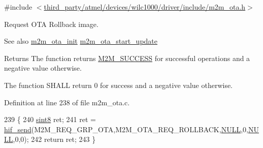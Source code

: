 {\ttfamily \#include $<$\hyperlink{m2m__ota_8h}{third\+\_\+party/atmel/devices/wilc1000/driver/include/m2m\+\_\+ota.\+h}$>$}



Request O\+TA Rollback image. 

\begin{DoxySeeAlso}{See also}
\hyperlink{group__OtaInitFn_gacd2a1a8ffaccc3deb1970cf1ad41ceec}{m2m\+\_\+ota\+\_\+init} \hyperlink{group__OtaStartUpdatefn_gac50387eab16b3257f1c037942f2682fd}{m2m\+\_\+ota\+\_\+start\+\_\+update}
\end{DoxySeeAlso}
\begin{DoxyReturn}{Returns}
The function returns \hyperlink{nm__common_8h_a9ef27ba27aafdd1aa3a79d3ba2c36b8f}{M2\+M\+\_\+\+S\+U\+C\+C\+E\+SS} for successful operations and a negative value otherwise.

The function S\+H\+A\+LL return 0 for success and a negative value otherwise. 
\end{DoxyReturn}


Definition at line 238 of file m2m\+\_\+ota.\+c.


\begin{DoxyCode}
239 \{
240     \hyperlink{group__DataT_gae35f10ffd0ac8dd2bc3e794da9bdfbc7}{sint8} ret;
241     ret = \hyperlink{m2m__hif_8c_a13ba8ad11b2ac39516ca787386d16ce0}{hif\_send}(M2M\_REQ\_GRP\_OTA,M2M\_OTA\_REQ\_ROLLBACK,\hyperlink{group__BSPDefine_ga070d2ce7b6bb7e5c05602aa8c308d0c4}{NULL},0,\hyperlink{group__BSPDefine_ga070d2ce7b6bb7e5c05602aa8c308d0c4}{NULL},0,0);
242     \textcolor{keywordflow}{return} ret;
243 \}
\end{DoxyCode}
